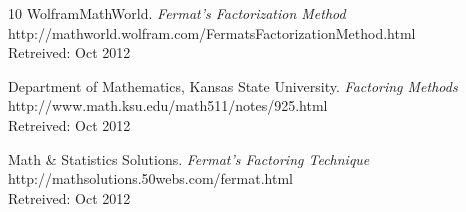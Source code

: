 \documentclass[a4paper, 12pt]{report}
\begin{document}
\begin{thebibliography} {10}
	WolframMathWorld.
	\emph{Fermat's Factorization Method} \\
	http://mathworld.wolfram.com/FermatsFactorizationMethod.html \\
	Retreived: Oct 2012
	
	Department of Mathematics, Kansas State University.
	\emph{Factoring Methods} \\
	http://www.math.ksu.edu/math511/notes/925.html \\
	Retreived: Oct 2012
	
	Math \& Statistics Solutions.
	\emph{Fermat's Factoring Technique} \\
	http://mathsolutions.50webs.com/fermat.html \\
	Retreived: Oct 2012
\end{thebibliography}
\end{document}
